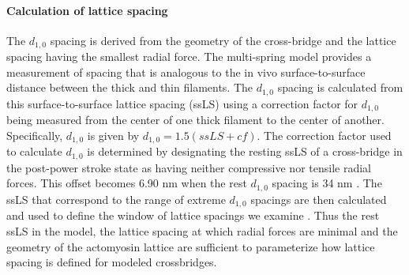 \documentclass[]{article}
\begin{document}


\paragraph{Calculation of lattice spacing} %
The $d_{1,0}$ spacing is derived from the geometry of the cross-bridge and the lattice spacing having the smallest radial force. 
The multi-spring model provides a measurement of spacing that is analogous to the in vivo surface-to-surface distance between the thick and thin filaments.
The $d_{1,0}$ spacing is calculated from this surface-to-surface lattice spacing (ssLS) using a correction factor for $d_{1,0}$ being measured from the center of one thick filament to the center of another. 
Specifically, $d_{1,0}$ is given by $d_{1,0} = 1.5 (ssLS + cf)$. %
The correction factor used to calculate $d_{1,0}$ is determined by designating the resting ssLS of a cross-bridge in the post-power stroke state as having neither compressive nor tensile radial forces. 
This offset becomes 6.90 nm when the rest $d_{1,0}$ spacing is 34 nm \citep{Brenner1991}. 
The ssLS that correspond to the range of extreme $d_{1,0}$ spacings are then calculated and used to define the window of lattice spacings we examine \citep{Millman1998}. %
Thus the rest ssLS in the model, the lattice spacing at which radial forces are minimal and the geometry of the actomyosin lattice are sufficient to parameterize how lattice spacing is defined for modeled crossbridges. 
\end{document}
